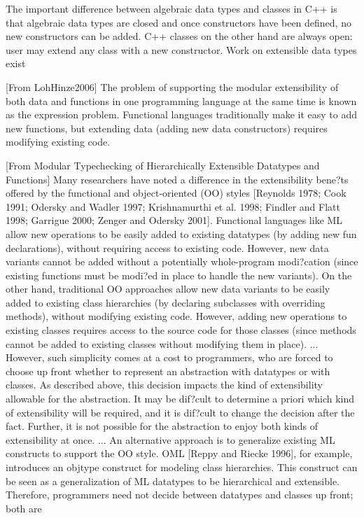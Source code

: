 \documentclass[submission,copyright]{eptcs}
\begin{document}
The important difference between algebraic data types and classes in C++ is that
algebraic data types are closed and once constructors have been defined, no new
constructors can be added. C++ classes on the other hand are always open: user 
may extend any class with a new constructor. Work on extensible data types 
exist~\cite{ExtensibleDatatypes,LohHinze2006}

[From LohHinze2006]
The problem of supporting the modular extensibility of both data
and functions in one programming language at the same time is
known as the expression problem. Functional languages traditionally
make it easy to add new functions, but extending data
(adding new data constructors) requires modifying existing code.

[From Modular Typechecking of Hierarchically Extensible Datatypes and Functions]
Many researchers have noted a difference in the extensibility bene?ts offered
by the functional and object-oriented (OO) styles [Reynolds 1978; Cook 1991;
Odersky and Wadler 1997; Krishnamurthi et al. 1998; Findler and Flatt 1998;
Garrigue 2000; Zenger and Odersky 2001]. Functional languages like ML allow new operations to be easily added to existing datatypes (by adding new
fun declarations), without requiring access to existing code. However, new data
variants cannot be added without a potentially whole-program modi?cation
(since existing functions must be modi?ed in place to handle the new variants). On the other hand, traditional OO approaches allow new data variants
to be easily added to existing class hierarchies (by declaring subclasses with
overriding methods), without modifying existing code. However, adding new operations to existing classes requires access to the source code for those classes
(since methods cannot be added to existing classes without modifying them in
place).
...
However, such simplicity comes at a cost to programmers, who are forced to choose
up front whether to represent an abstraction with datatypes or with classes. As
described above, this decision impacts the kind of extensibility allowable for the
abstraction. It may be dif?cult to determine a priori which kind of extensibility
will be required, and it is dif?cult to change the decision after the fact. Further, it is not possible for the abstraction to enjoy both kinds of extensibility at
once.
...
An alternative approach is to generalize existing ML constructs to support
the OO style. OML [Reppy and Riecke 1996], for example, introduces an objtype
construct for modeling class hierarchies. This construct can be seen as a generalization of ML datatypes to be hierarchical and extensible. Therefore, programmers need not decide between datatypes and classes up front; both are
\end{document}
